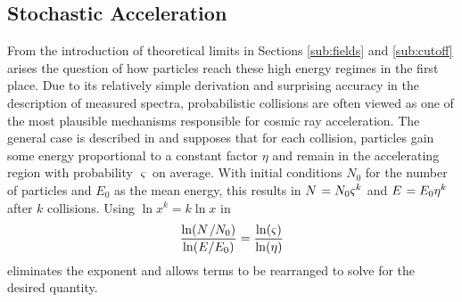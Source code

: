 \subsection{Stochastic Acceleration}
\label{sub:acceleration}

From the introduction of theoretical limits in Sections \ref{sub:fields} and \ref{sub:cutoff} arises the question of how
particles reach these high energy regimes in the first place. Due to its relatively simple derivation and surprising accuracy
in the description of measured spectra, probabilistic collisions are often viewed as one of the most plausible mechanisms
responsible for cosmic ray acceleration. The general case is described in \cite{Longair_2011} and supposes that for each
collision, particles gain some energy proportional to a constant factor $\eta$ and remain in the accelerating region with
probability $\varsigma$ on average. With initial conditions $N_0$ for the number of particles and $E_0$ as the mean
energy, this results in $N \kern+0.9pt = N_0 \varsigma^k$ and $E \kern+0.9pt = E_0 \eta^k$ after $k$ collisions. Using
$\ln x^k = k\ln x$ in
\begin{equation*}
	\frac{\ln (N \kern+1.0pt / N_0)}{\ln (E / E_0)} = \frac{\ln(\varsigma)}{\ln(\eta)}
\end{equation*}
eliminates the exponent and allows terms to be rearranged to solve for the desired quantity.

\enlargethispage*{\baselineskip}\newpage

